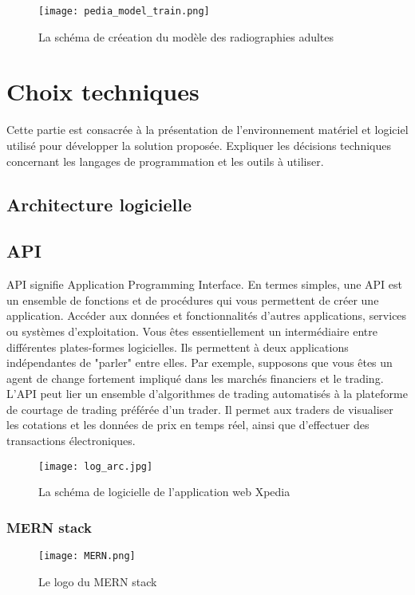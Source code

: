     \begin{figure}[H]
        \centering
        \texttt{[image: pedia\_model\_train.png]}
        \caption{La schéma de créeation du modèle des radiographies adultes}\label{fig:pedia_model_schema}
    \end{figure}
\section{Choix techniques}
Cette partie est consacrée à la présentation de l'environnement matériel et logiciel utilisé pour développer la solution proposée. Expliquer les décisions techniques concernant les langages de programmation et les outils à utiliser.
    \subsection{Architecture logicielle}
    \subsection{API}
    API signifie Application Programming Interface. En termes simples, une API est un ensemble de fonctions et de procédures qui vous permettent de créer une application. Accéder aux données et fonctionnalités d'autres applications, services ou systèmes d'exploitation. 
    Vous êtes essentiellement un intermédiaire entre différentes plates-formes logicielles. Ils permettent à deux applications indépendantes de "parler" entre elles. 
    Par exemple, supposons que vous êtes un agent de change fortement impliqué dans les marchés financiers et le trading. L'API peut lier un ensemble d'algorithmes de trading automatisés à la plateforme de courtage de trading préférée d'un trader. Il permet aux traders de visualiser les cotations et les données de prix en temps réel, ainsi que d'effectuer des transactions électroniques.

    \begin{figure}[H]
        \centering
        \texttt{[image: log\_arc.jpg]}
        \caption{La schéma de logicielle de l'application web Xpedia}\label{fig:log_arc}
    \end{figure}

    \subsubsection{MERN stack}
    \begin{figure}[H]
        \centering
        \texttt{[image: MERN.png]}
        \caption{Le logo du MERN stack}\label{fig:mern}
    \end{figure}
